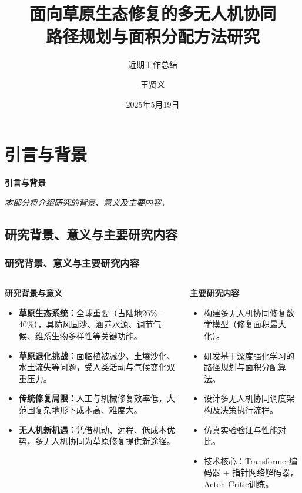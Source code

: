 \documentclass[11pt, aspectratio=169]{beamer}  %
\title{面向草原生态修复的多无人机协同\\路径规划与面积分配方法研究}
\subtitle{近期工作总结}
\author{王贤义}
\institute{兰州大学信息科学与工程学院}
\date{2025年5月19日}
\begin{document}
\section{引言与背景}
\begin{frame}
	\centering %
	{\Huge \sffamily\bfseries\textcolor{njupt}{引言与背景}}
	\par %
	\vspace{0.5cm} %
	{\large \itshape{本部分将介绍研究的背景、意义及主要内容。}} %
\end{frame}

\subsection{研究背景、意义与主要研究内容}
\begin{frame}
	\frametitle{研究背景、意义与主要研究内容}
	\begin{columns}[T]
		\begin{column}{0.5\textwidth} %
			\small %
			\textbf{研究背景与意义}
			\begin{itemize}
				\item \textbf{草原生态系统：}全球重要（占陆地26\%--40\%），具防风固沙、涵养水源、调节气候、维系生物多样性等关键功能。
				\item \textbf{草原退化挑战：}面临植被减少、土壤沙化、水土流失等问题，受人类活动与气候变化双重压力。
				\item \textbf{传统修复局限：}人工与机械修复效率低，大范围复杂地形下成本高、难度大。
				\item \textbf{无人机新机遇：}凭借机动、远程、低成本优势，多无人机协同为草原修复提供新途径。
			\end{itemize}
		\end{column}
		\begin{column}{0.5\textwidth} %
			\small %
			\textbf{主要研究内容}
			\begin{itemize}
				\item 构建多无人机协同修复数学模型（修复面积最大化）。
				\item 研发基于深度强化学习的路径规划与面积分配算法。
				\item 设计多无人机协同调度架构及决策执行流程。
				\item 仿真实验验证与性能对比。
				\item 技术核心：Transformer编码器 + 指针网络解码器，Actor--Critic训练。
			\end{itemize}
		\end{column}
	\end{columns}
\end{frame}
\end{document}
